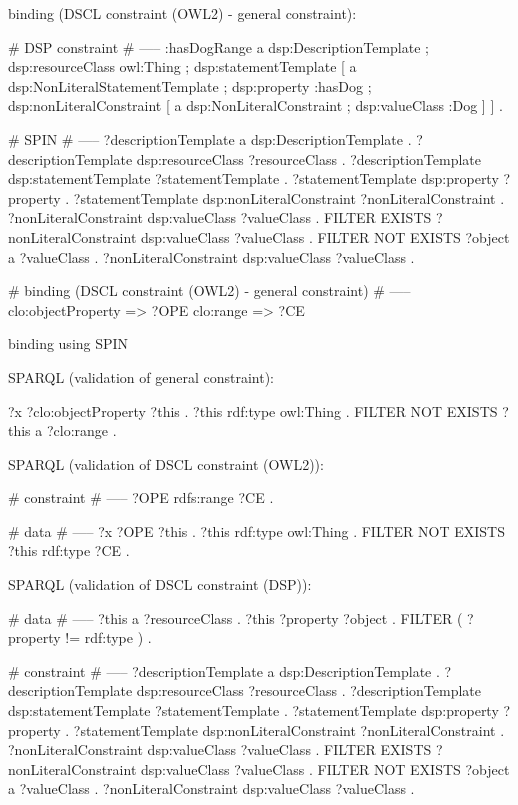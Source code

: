 \documentclass{llncs}
\begin{document}
binding (DSCL constraint (OWL2) - general constraint):
\begin{ex}
# DSP constraint
# -----
:hasDogRange
        a dsp:DescriptionTemplate ; 
        dsp:resourceClass owl:Thing ; 
        dsp:statementTemplate [
            a dsp:NonLiteralStatementTemplate ;
            dsp:property :hasDog ; 
            dsp:nonLiteralConstraint [ 
                a dsp:NonLiteralConstraint ;
                dsp:valueClass :Dog ] ] .
								
# SPIN
# -----
?descriptionTemplate a dsp:DescriptionTemplate .
?descriptionTemplate dsp:resourceClass ?resourceClass .
?descriptionTemplate dsp:statementTemplate ?statementTemplate .
?statementTemplate dsp:property ?property .
?statementTemplate dsp:nonLiteralConstraint ?nonLiteralConstraint .
?nonLiteralConstraint dsp:valueClass ?valueClass .				
FILTER EXISTS { ?nonLiteralConstraint dsp:valueClass ?valueClass . }
FILTER NOT EXISTS { ?object a ?valueClass . ?nonLiteralConstraint dsp:valueClass ?valueClass . }
								
# binding (DSCL constraint (OWL2) - general constraint)
# -----
clo:objectProperty => ?OPE
clo:range => ?CE 
\end{ex}

binding using SPIN

SPARQL (validation of general constraint):
\begin{ex}
?x ?clo:objectProperty ?this .
?this rdf:type owl:Thing . 
FILTER NOT EXISTS { ?this a ?clo:range } .
\end{ex}

SPARQL (validation of DSCL constraint (OWL2)):
\begin{ex}
# constraint
# -----
?OPE rdfs:range ?CE .

# data 
# ----- 
?x ?OPE ?this .
?this rdf:type owl:Thing . 
FILTER NOT EXISTS { ?this rdf:type ?CE } .
\end{ex}

SPARQL (validation of DSCL constraint (DSP)):
\begin{ex}
# data 
# -----
?this a ?resourceClass .
?this ?property ?object .
FILTER ( ?property != rdf:type ) .

# constraint
# -----
?descriptionTemplate a dsp:DescriptionTemplate .
?descriptionTemplate dsp:resourceClass ?resourceClass .
?descriptionTemplate dsp:statementTemplate ?statementTemplate .
?statementTemplate dsp:property ?property .
?statementTemplate dsp:nonLiteralConstraint ?nonLiteralConstraint .
?nonLiteralConstraint dsp:valueClass ?valueClass .				
FILTER EXISTS { ?nonLiteralConstraint dsp:valueClass ?valueClass . }
FILTER NOT EXISTS { ?object a ?valueClass . ?nonLiteralConstraint dsp:valueClass ?valueClass . }
\end{ex}
\end{document}
